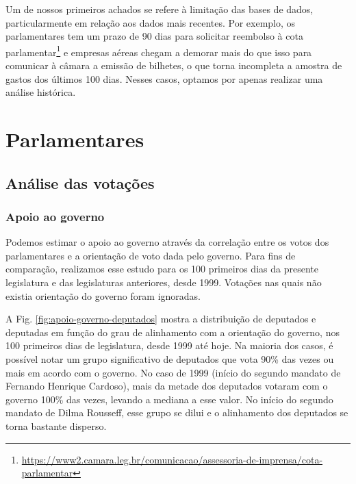 \documentclass[12pt,a4paper]{article}
\newcommand{\footurl}[1]{{\scriptsize\url{#1}}}
\newcommand{\HX}[1]{{\centering\color{red}\large<#1>}}
\begin{document}
Um de nossos primeiros achados se refere à limitação das bases de dados, particularmente em relação
aos dados mais recentes. Por exemplo, os parlamentares tem um prazo de 90 dias para solicitar reembolso
à cota parlamentar\footnote{\footurl{https://www2.camara.leg.br/comunicacao/assessoria-de-imprensa/cota-parlamentar}}
e empresas aéreas chegam a demorar mais do que isso para comunicar à câmara a emissão de
bilhetes, o que torna incompleta a amostra de gastos dos últimos 100 dias. Nesses casos, optamos por apenas
realizar uma análise histórica.

\HX{Incluir tabela com dados disponíveis e não disponíveis em 2019}
\HX{Incluit tabela com análises com câmara e senado}

\section{Parlamentares}


\subsection{Análise das votações}

\subsubsection{Apoio ao governo}

Podemos estimar o apoio ao governo através da correlação entre os votos dos parlamentares e a orientação de voto
dada pelo governo. Para fins de comparação, realizamos esse estudo para os 100 primeiros dias da presente legislatura
e das legislaturas anteriores, desde 1999. Votações nas quais não existia orientação do governo foram ignoradas.

A Fig. \ref{fig:apoio-governo-deputados} mostra a distribuição de deputados e deputadas em função do grau de
alinhamento com a orientação do governo, nos 100 primeiros dias de legislatura, desde 1999 até hoje.
Na maioria dos casos, é possível notar um grupo significativo de deputados que vota 90\% das vezes ou mais em acordo com o governo.
No caso de 1999 (início do segundo mandato de Fernando Henrique Cardoso), mais da metade dos deputados votaram
com o governo 100\% das vezes, levando a mediana a esse valor. No início do segundo mandato de Dilma Rousseff,
esse grupo se dilui e o alinhamento dos deputados se torna bastante disperso.
\end{document}
